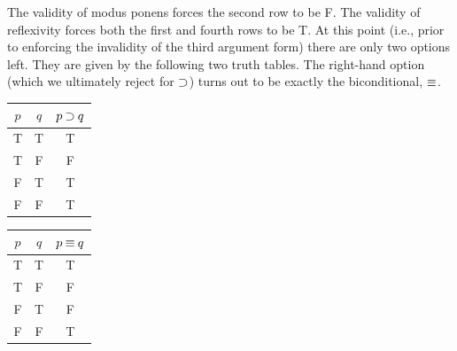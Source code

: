 \documentclass[options]{philosophersimprint}
\theoremstyle{definition}
\begin{document}
The validity of modus ponens forces the second row to be F. The validity of reflexivity forces both the first and fourth rows to be T. At this point (i.e., prior to enforcing the invalidity of the third argument form) there are only two options left. They are given by the following two truth tables. The right-hand option (which we ultimately reject for $\mathbin{\supset}$) turns out to be exactly the biconditional, $\mathbin{\equiv}$.
\begin{table}[h!]
    \centering
    \begin{tabular}{c c| c}
        $p$ & $q$ & $p \mathbin{\supset} q$ \\
        \hline
        T & T & T \\
        T & F & F\\
        F & T & T\\
        F & F & T\\
    \end{tabular}
    \hspace{.5cm}
    \begin{tabular}{c c| c}
        $p$ & $q$ & $p\mathbin{\equiv} q$ \\
        \hline
        T & T & T \\
        T & F & F\\
        F & T & F\\
        F & F & T\\
    \end{tabular}
\end{table}
\vspace{-0.2cm}
\end{document}
